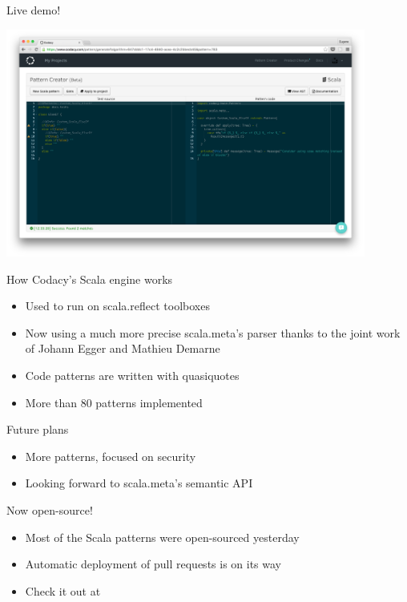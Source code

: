 \documentclass[svgnames,dvipsnames,hyperref={bookmarks=false},usepdftitle=false]{beamer}
\begin{document}
\begin{frame}[c, fragile]{Live demo!}
\begin{center}
\includegraphics[height=7.5cm]{codacy.png}
\end{center}
\end{frame}

\begin{frame}{How Codacy's Scala engine works}
\begin{itemize}
\item Used to run on scala.reflect toolboxes
\item Now using a much more precise scala.meta's parser thanks to the joint work of Johann Egger and Mathieu Demarne
\item Code patterns are written with quasiquotes
\item More than 80 patterns implemented
\end{itemize}
\end{frame}

\begin{frame}{Future plans}
\begin{itemize}
\item More patterns, focused on security
\item Looking forward to scala.meta's semantic API
\end{itemize}
\end{frame}

\begin{frame}{Now open-source!}
\begin{itemize}
\item Most of the Scala patterns were open-sourced yesterday
\item Automatic deployment of pull requests is on its way
\item Check it out at 
\end{itemize}
\end{frame}
\end{document}
